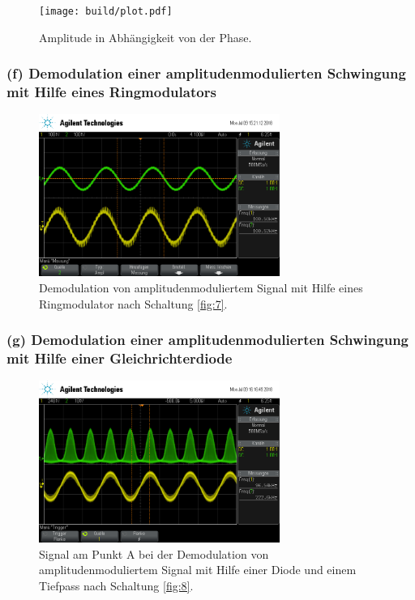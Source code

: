 \begin{figure}
  \centering
  \texttt{[image: build/plot.pdf]}
  \caption{Amplitude in Abhängigkeit von der Phase.}
  \label{fig:plot}
\end{figure}

\subsubsection{(f) Demodulation einer amplitudenmodulierten Schwingung
mit Hilfe eines Ringmodulators}
\label{subsubsec:auswertung_f}

\begin{figure}
  \centering
  \includegraphics[width=0.7\textwidth]{osci/amp_demod.png}
  \caption{Demodulation von amplitudenmoduliertem Signal mit Hilfe eines
  Ringmodulator nach Schaltung \ref{fig:7}.}
  \label{fig:amp_demod_ring}
\end{figure}




\subsubsection{(g) Demodulation einer amplitudenmodulierten Schwingung
mit Hilfe einer Gleichrichterdiode}
\label{subsubsec:auswertung_g}

\begin{figure}
  \centering
  \includegraphics[width=0.7\textwidth]{osci/amp_demod_diode_A.png}
  \caption{Signal am Punkt A bei der Demodulation von amplitudenmoduliertem Signal mit Hilfe einer
  Diode und einem Tiefpass nach Schaltung \ref{fig:8}.}
  \label{fig:diode_punkt_A}
\end{figure}


